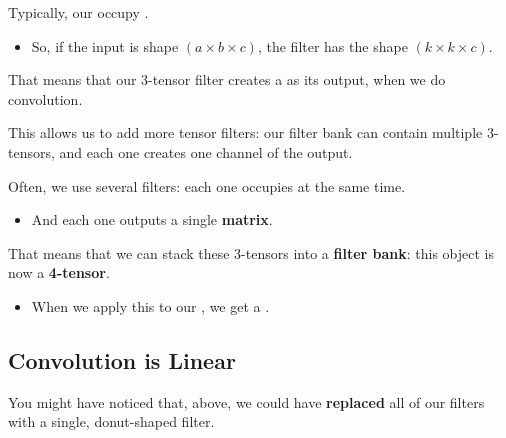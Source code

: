         \begin{concept}
            Typically, our  occupy .

            \begin{itemize}
                \item So, if the input is shape $(a \times b \times c)$, the filter has the shape $(k \times k \times c)$.
            \end{itemize}

            That means that our 3-tensor filter creates a  as its output, when we do convolution.
        \end{concept}

        This allows us to add more tensor filters: our filter bank can contain multiple 3-tensors, and each one creates one channel of the output.
            \\

        \begin{concept}
            Often, we use several  filters: each one occupies  at the same time.

            \begin{itemize}
                \item And each one outputs a single \textbf{matrix}.
            \end{itemize}

            That means that we can stack these 3-tensors into a \textbf{filter bank}: this object is now a \textbf{4-tensor}.

            \begin{itemize}
                \item When we apply this  to our , we get a .
            \end{itemize}
        \end{concept}
        

    \subsection{Convolution is Linear}

        You might have noticed that, above, we could have \textbf{replaced} all of our filters with a single, donut-shaped filter.


